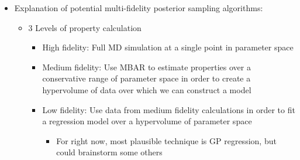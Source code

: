 \documentclass[aps,pre,nofootinbib,superscriptaddress,linenumbers,10pt, draft,tightenlines]{revtex4-1}
\begin{document}
\begin{itemize}
\begin{itemize}
        \item Explanation of potential multi-fidelity posterior sampling algorithms:
        \begin{itemize}
        	\item 3 Levels of property calculation
        	\begin{itemize}
        		\item High fidelity: Full MD simulation at a single point in parameter space
        		\item Medium fidelity: Use MBAR to estimate properties over a conservative range of parameter space in order to create a hypervolume of data
        		      over which we can construct a model
        		\item Low fidelity: Use data from medium fidelity calculations in order to fit a regression model over a hypervolume of parameter space
        		\begin{itemize}
        			\item For right now, most plausible technique is GP regression, but could brainstorm some others
        		\end{itemize}
        	\end{itemize}

\end{itemize}
\end{itemize}
\end{itemize}
\end{document}

